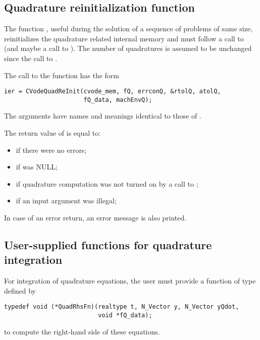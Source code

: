 
\subsection{Quadrature reinitialization function}\label{sss:cvqreinit}

The function , useful during the solution of a sequence of problems of 
same size, reinitializes the quadrature related internal memory 
and must follow a call to  (and maybe a call to ). 
The number  of quadratures is assumed to be unchanged since the call to 
.

The call to the  function has the form
\begin{verbatim}
ier = CVodeQuadReInit(cvode_mem, fQ, errconQ, &rtolQ, atolQ, 
                      fQ_data, machEnvQ);
\end{verbatim}
The arguments have names and meanings identical to those of .

The return value  of  is equal to: 
\begin{itemize}
\item {} if there were no errors; 
\item {} if  was NULL;
\item {} if quadrature computation was not turned on
      by a call to ;
\item {} if an input argument was illegal;
\end{itemize}
In case of an error return, an error message is also printed.  

\subsection{User-supplied functions for quadrature integration}

For integration of quadrature equations, the user must provide a function of
type  defined by
\begin{verbatim}
typedef void (*QuadRhsFn)(realtype t, N_Vector y, N_Vector yQdot, 
                          void *fQ_data);
\end{verbatim}
to compute the right-hand side of these equations.

